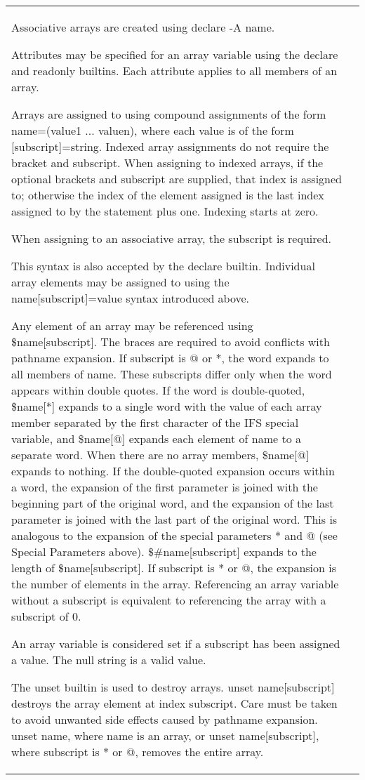 \documentclass[11pt]{article}
\begin{document}
\begin{longtable}{p{}p{}}
Associative arrays are created using declare -A name.

Attributes may be specified for an array variable using the declare and readonly builtins. Each attribute applies to all members of an array.

Arrays are assigned to using compound assignments of the form name=(value1 ... valuen), where each value is of the form [subscript]=string. Indexed array assignments do not require the bracket and subscript. When assigning to indexed arrays, if the optional brackets and subscript are supplied, that index is assigned to; otherwise the index of the element assigned is the last index assigned to by the statement plus one. Indexing starts at zero.

When assigning to an associative array, the subscript is required.

This syntax is also accepted by the declare builtin. Individual array elements may be assigned to using the name[subscript]=value syntax introduced above.

Any element of an array may be referenced using \${name[subscript]}. The braces are required to avoid conflicts with pathname expansion. If subscript is @ or *, the word expands to all members of name. These subscripts differ only when the word appears within double quotes. If the word is double-quoted, \${name[*]} expands to a single word with the value of each array member separated by the first character of the IFS special variable, and \${name[@]} expands each element of name to a separate word. When there are no array members, \${name[@]} expands to nothing. If the double-quoted expansion occurs within a word, the expansion of the first parameter is joined with the beginning part of the original word, and the expansion of the last parameter is joined with the last part of the original word. This is analogous to the expansion of the special parameters * and @ (see Special Parameters above). \${\#name[subscript]} expands to the length of \${name[subscript]}. If subscript is * or @, the expansion is the number of elements in the array. Referencing an array variable without a subscript is equivalent to referencing the array with a subscript of 0.

An array variable is considered set if a subscript has been assigned a value. The null string is a valid value.

The unset builtin is used to destroy arrays. unset name[subscript] destroys the array element at index subscript. Care must be taken to avoid unwanted side effects caused by pathname expansion. unset name, where name is an array, or unset name[subscript], where subscript is * or @, removes the entire array.


\end{longtable}
\end{document}
